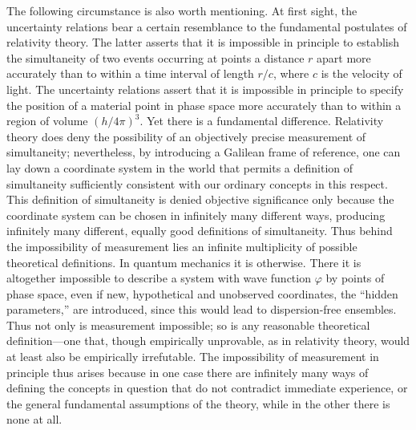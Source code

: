 \documentclass[fontsize=13pt,twoside,openany,headings=normal,parskip=false,bookmarkpackage=false,DIV=calc]{scrbook}
\begin{document}
The following circumstance is also worth mentioning. At first sight, the uncertainty relations bear a certain resemblance to the fundamental postulates of relativity theory. The latter asserts that it is impossible in principle to establish the simultaneity of two events occurring at points a distance $r$ apart more accurately than to within a time interval of length $r/c$, where $c$ is the velocity of light. The uncertainty relations assert that it is impossible in principle to specify the position of a material point in phase space more accurately than to within a region of volume $(h/4\pi)^3$.%
\hypertarget{origpage-172}{}%
 Yet there is a fundamental difference. Relativity theory does deny the possibility of an objectively precise measurement of simultaneity; nevertheless, by introducing a Galilean frame of reference, one can lay down a coordinate system in the world that permits a definition of simultaneity sufficiently consistent with our ordinary concepts in this respect. This definition of simultaneity is denied objective significance only because the coordinate system can be chosen in infinitely many different ways, producing infinitely many different, equally good definitions of simultaneity. Thus behind the impossibility of measurement lies an infinite multiplicity of possible theoretical definitions. In quantum mechanics it is otherwise. There it is altogether impossible to describe a system with wave function $\varphi$ by points of phase space, even if new, hypothetical and unobserved coordinates, the ``hidden parameters,'' are introduced, since this would lead to dispersion-free ensembles. Thus not only is measurement impossible; so is any reasonable theoretical definition---one that, though empirically unprovable, as in relativity theory, would at least also be empirically irrefutable. The impossibility of measurement in principle thus arises because in one case there are infinitely many ways of defining the concepts in question that do not contradict immediate experience, or the general fundamental assumptions of the theory, while in the other there is none at all.
\end{document}
